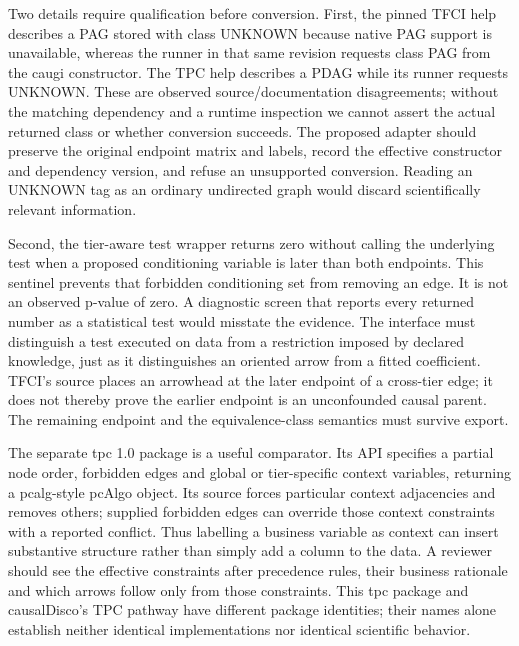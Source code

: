 Two details require qualification before conversion. First, the pinned TFCI
help describes a PAG stored with class UNKNOWN because native PAG support is
unavailable, whereas the runner in that same revision requests class PAG from
the caugi constructor. The TPC help describes a PDAG while its runner requests
UNKNOWN. These are observed source/documentation disagreements; without the
matching dependency and a runtime inspection we cannot assert the actual returned
class or whether conversion succeeds. The proposed adapter should preserve the
original endpoint matrix and labels, record the effective constructor and
dependency version, and refuse an unsupported conversion. Reading an UNKNOWN
tag as an ordinary undirected graph would discard scientifically relevant
information. \citep{exec14_rtime_causaldisco}

Second, the tier-aware test wrapper returns zero without calling the underlying
test when a proposed conditioning variable is later than both endpoints. This
sentinel prevents that forbidden conditioning set from removing an edge. It is
not an observed p-value of zero. A diagnostic screen that reports every returned
number as a statistical test would misstate the evidence. The interface must
distinguish a test executed on data from a restriction imposed by declared
knowledge, just as it distinguishes an oriented arrow from a fitted coefficient.
TFCI's source places an arrowhead at the later endpoint of a cross-tier edge;
it does not thereby prove the earlier endpoint is an unconfounded causal parent.
The remaining endpoint and the equivalence-class semantics must survive export.
\citep{exec14_rtime_causaldisco}

The separate tpc 1.0 package is a useful comparator. Its API specifies a partial
node order, forbidden edges and global or tier-specific context variables,
returning a pcalg-style pcAlgo object. Its source forces particular context
adjacencies and removes others; supplied forbidden edges can override those
context constraints with a reported conflict. Thus labelling a business variable
as context can insert substantive structure rather than simply add a column to
the data. A reviewer should see the effective constraints after precedence rules,
their business rationale and which arrows follow only from those constraints.
This tpc package and causalDisco's TPC pathway have different package identities;
their names alone establish neither identical implementations nor identical
scientific behavior. \citep{exec14_rtime_tpc}


